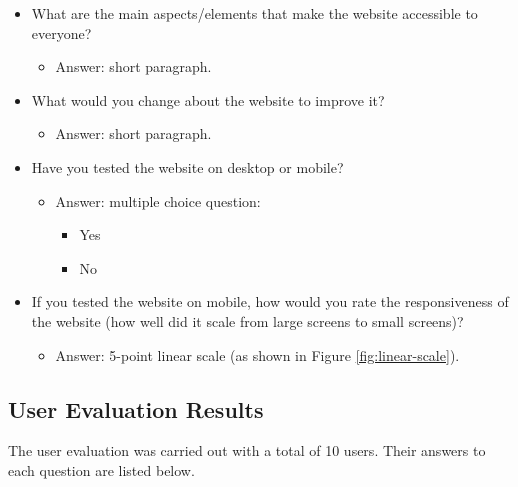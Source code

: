 \documentclass[letterpaper,12pt]{article}
\begin{document}
\begin{appendices}
\begin{itemize}
    \item What are the main aspects/elements that make the website accessible to everyone?
    \begin{itemize}
        \item Answer: short paragraph.
    \end{itemize}
\end{itemize}

\begin{itemize}
    \item What would you change about the website to improve it?
    \begin{itemize}
        \item Answer: short paragraph.
    \end{itemize}
\end{itemize}

\begin{itemize}
    \item Have you tested the website on desktop or mobile?
    \begin{itemize}
        \item Answer: multiple choice question:
        \begin{itemize}
            \item Yes
            \item No
        \end{itemize}
    \end{itemize}
\end{itemize}

\begin{itemize}
    \item If you tested the website on mobile, how would you rate the responsiveness of the website (how well did it scale from large screens to small screens)?
    \begin{itemize}
        \item Answer: 5-point linear scale (as shown in Figure \ref{fig:linear-scale}).
    \end{itemize}
\end{itemize}

\subsection{User Evaluation Results}
\label{sec:appendix-user-evaluation-results}

The user evaluation was carried out with a total of 10 users. Their answers to each question are listed below.


\end{appendices}
\end{document}
